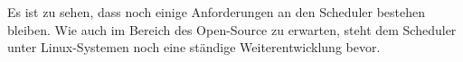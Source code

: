 \documentclass[ngerman]{seminarvorlage}
\begin{document}
Es ist zu sehen, dass noch einige Anforderungen an den Scheduler bestehen bleiben.
Wie auch im Bereich des Open-Source zu erwarten, steht dem Scheduler unter Linux-Systemen noch eine ständige Weiterentwicklung bevor.  


\pagebreak

%
%


\end{document}
